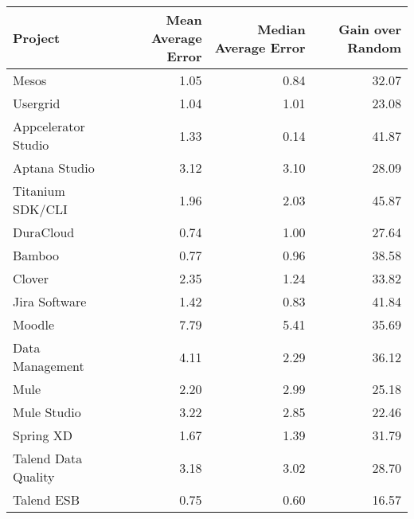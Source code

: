 \begin{tabular}{lrrr}
\toprule
             Project &  Mean Average Error &  Median Average Error &  Gain over Random \\
\midrule
               Mesos &                1.05 &                  0.84 &             32.07 \\
            Usergrid &                1.04 &                  1.01 &             23.08 \\
 Appcelerator Studio &                1.33 &                  0.14 &             41.87 \\
       Aptana Studio &                3.12 &                  3.10 &             28.09 \\
    Titanium SDK/CLI &                1.96 &                  2.03 &             45.87 \\
           DuraCloud &                0.74 &                  1.00 &             27.64 \\
              Bamboo &                0.77 &                  0.96 &             38.58 \\
              Clover &                2.35 &                  1.24 &             33.82 \\
       Jira Software &                1.42 &                  0.83 &             41.84 \\
              Moodle &                7.79 &                  5.41 &             35.69 \\
     Data Management &                4.11 &                  2.29 &             36.12 \\
                Mule &                2.20 &                  2.99 &             25.18 \\
         Mule Studio &                3.22 &                  2.85 &             22.46 \\
           Spring XD &                1.67 &                  1.39 &             31.79 \\
 Talend Data Quality &                3.18 &                  3.02 &             28.70 \\
          Talend ESB &                0.75 &                  0.60 &             16.57 \\
\bottomrule
\end{tabular}

